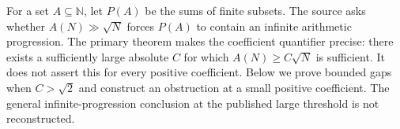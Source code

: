 For a set $A\subseteq\mathbb N$, let $P(A)$ be the sums of finite subsets. The source asks whether $A(N)\gg\sqrt N$ forces $P(A)$ to contain an infinite arithmetic progression. The primary theorem makes the coefficient quantifier precise: there exists a sufficiently large absolute $C$ for which $A(N)\ge C\sqrt N$ is sufficient. It does not assert this for every positive coefficient. Below we prove bounded gaps when $C>\sqrt2$ and construct an obstruction at a small positive coefficient. The general infinite-progression conclusion at the published large threshold is not reconstructed.
